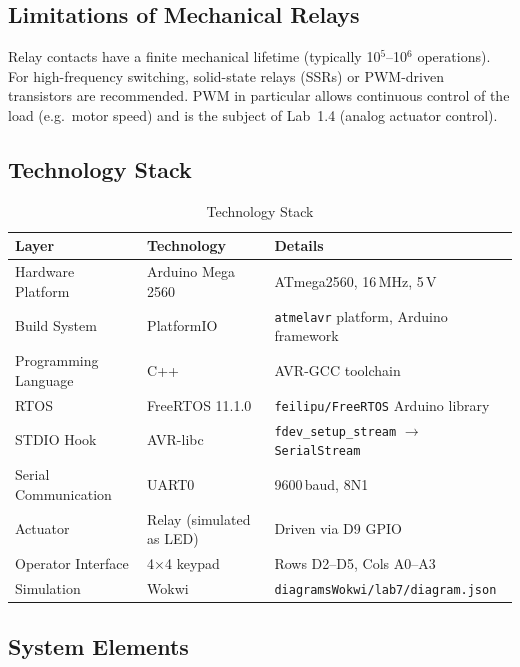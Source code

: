 \documentclass[12pt]{article}
\begin{document}
\subsection{Limitations of Mechanical Relays}

Relay contacts have a finite mechanical lifetime (typically 10$^5$--10$^6$ operations). For high-frequency switching, solid-state relays (SSRs) or PWM-driven transistors are recommended. PWM in particular allows continuous control of the load (e.g.\ motor speed) and is the subject of Lab~1.4 (analog actuator control).

\subsection{Technology Stack}

\begin{table}[H]
\centering
\begin{tabular}{@{}lll@{}}
\toprule
\textbf{Layer} & \textbf{Technology} & \textbf{Details} \\
\midrule
Hardware Platform    & Arduino Mega 2560  & ATmega2560, 16\,MHz, 5\,V \\
Build System         & PlatformIO         & \texttt{atmelavr} platform, Arduino framework \\
Programming Language & C++                & AVR-GCC toolchain \\
RTOS                 & FreeRTOS 11.1.0    & \texttt{feilipu/FreeRTOS} Arduino library \\
STDIO Hook           & AVR-libc           & \texttt{fdev\_setup\_stream} $\to$ \texttt{SerialStream} \\
Serial Communication & UART0              & 9600\,baud, 8N1 \\
Actuator             & Relay (simulated as LED) & Driven via D9 GPIO \\
Operator Interface   & 4$\times$4 keypad  & Rows D2--D5, Cols A0--A3 \\
Simulation           & Wokwi              & \texttt{diagramsWokwi/lab7/diagram.json} \\
\bottomrule
\end{tabular}
\caption{Technology Stack}
\label{tab:techstack}
\end{table}

\subsection{System Elements}
\end{document}
